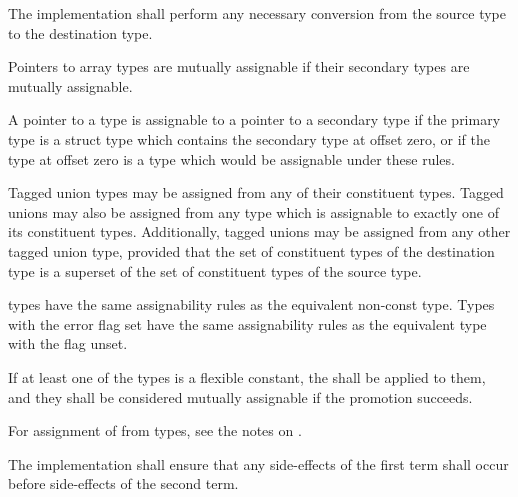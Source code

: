The implementation shall perform any necessary conversion from the source type
to the destination type.

\specsubsubitem
Pointers to array types are mutually assignable if their secondary types are
mutually assignable.

\specsubsubitem
A pointer to a type is assignable to a pointer to a secondary type if
the primary type is a struct type which contains the secondary type at
offset zero, or if the type at offset zero is a type which would be assignable
under these rules.

\specsubsubitem
Tagged union types may be assigned from any of their constituent types. Tagged
unions may also be assigned from any type which is assignable to exactly one of
its constituent types. Additionally, tagged unions may be assigned from any
other tagged union type, provided that the set of constituent types of the
destination type is a superset of the set of constituent types of the source
type.

\specsubsubitem
{} types have the same assignability rules as the equivalent
non-const type. Types with the error flag set have the same assignability rules
as the equivalent type with the flag unset.

\specsubsubitem
If at least one of the types is a flexible constant, the
 shall be applied to them, and
they shall be considered mutually assignable if the promotion succeeds.


\specsubsubitem
For assignment of \terminal{*}   from
 types, see the notes on .

\specsubsubitem
The implementation shall ensure that any side-effects of the first term shall
occur before side-effects of the second term.


